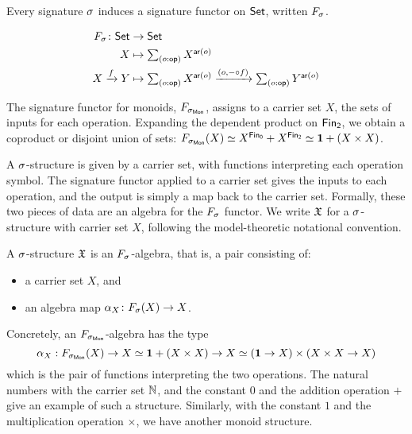 Every signature $\sigma$ induces a signature functor on $\mathsf{Set}$, written $\Sig$.

\begin{definition}
    \begin{align*}
        \Sig \colon \Set & \to \Set                         \\
        X                & \mapsto \dsum{o:\op}{X^{\ar(o)}} \\
        X \xto{f} Y      & \mapsto
        \dsum{o:\op}{X^{\ar(o)}}
        \xto{(o, \blank \comp f)}
        \dsum{o:\op}{Y^{\ar(o)}}
    \end{align*}
\end{definition}

\begin{example}
    The signature functor for monoids, $\SigMon$, assigns to a carrier set $X$,
    the sets of inputs for each operation.
    Expanding the dependent product on $\Fin[2]$, we obtain a coproduct or disjoint union of sets:
    $\SigMon(X) \eqv X^{\Fin[0]} + X^{\Fin[2]} \eqv \unitt + (X \times X)$.
\end{example}

A $\sigma$-structure is given by a carrier set, with functions interpreting each operation symbol.
%
The signature functor applied to a carrier set gives the inputs to each operation, and the output is simply a map back
to the carrier set.
%
Formally, these two pieces of data are an algebra for the $\Sig$ functor.
%
We write $\mathfrak{X}$ for a $\sigma$-structure with carrier set $X$, following the model-theoretic notational convention.

\begin{definition}[Structure]
    A $\sigma$-structure $\mathfrak{X}$ is an $\Sig$-algebra, that is, a pair consisting of:
    \begin{itemize}
        \item a carrier set $X$, and
        \item an algebra map $\alpha_{X}\colon \Sig(X) \to X$.
    \end{itemize}
\end{definition}

\begin{example}
    Concretely, an $\SigMon$-algebra has the type
    \[
        \alpha_{X} : \SigMon(X) \to X \eqv \unitt + (X \times X) \to X \eqv (\unitt \to X) \times (X \times X \to X)
    \]
    which is the pair of functions interpreting the two operations.
    The natural numbers with the carrier set $\mathbb{N}$,
    and the constant $0$ and the addition operation $+$ give an example of such a structure.
    Similarly, with the constant $1$ and the multiplication operation $\times$, we have another monoid structure.
\end{example}

